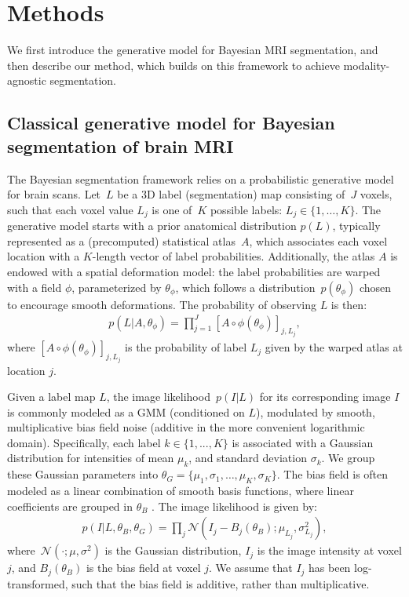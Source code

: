 \documentclass{midl}
\begin{document}
\section{Methods}

We first introduce the generative model for Bayesian MRI segmentation, and then describe our method, which builds on this framework to achieve modality-agnostic segmentation.

\subsection{Classical generative model for Bayesian segmentation of brain MRI}
\label{bayesian}

The Bayesian segmentation framework relies on a probabilistic generative model for brain  scans. Let~$L$ be a 3D label (segmentation) map consisting of~$J$ voxels, such that each voxel value $L_j$ is one of~$K$ possible labels: $L_j \in \{1,\ldots,K\}$. The generative model starts with a prior anatomical distribution $p(L)$, typically represented as a (precomputed) statistical atlas~$A$, which associates each voxel location with a $K$-length vector of label probabilities. Additionally, the atlas $A$ is endowed with a spatial deformation model: the label probabilities are warped with a field $\phi$, parameterized by $\theta_{\phi}$, which follows a distribution~$p(\theta_{\phi})$ chosen to encourage smooth deformations. The probability of observing $L$ is then:
\begin{align}
    p(L| A, \theta_\phi) = \prod_{j=1}^{J} [A \circ \phi(\theta_{\phi})]_{j,L_j},
\end{align}
where $[A \circ \phi(\theta_{\phi})]_{j,L_j}$ is the probability of label $L_j$ given by the warped atlas at location $j$. 

Given a label map $L$, the image likelihood~$p(I|L)$ for its corresponding image $I$ is commonly modeled as a GMM (conditioned on $L$), modulated by smooth, multiplicative bias field noise (additive in the more convenient logarithmic domain). Specifically, each label $k \in \lbrace1,...,K\rbrace$ is associated with a Gaussian distribution for intensities of mean $\mu_{k}$, and standard deviation $\sigma_{k}$. We group these Gaussian parameters into $\theta_G = \{\mu_1,\sigma_1,\ldots,\mu_K,\sigma_K\}$. The bias field is often modeled as a linear combination of smooth basis functions, where linear coefficients are grouped in $\theta_{B}$ \cite{larsen_n3_2014}. The image likelihood is given by:
\begin{align}
    p(I | L, \theta_B, \theta_G) = \prod_j \mathcal{N}(I_j - B_j(\theta_B) ; \mu_{L_j} , \sigma_{L_j}^2),
    \label{eq:likelihood}
\end{align}
where~$\mathcal{N}(\cdot; \mu, \sigma^2)$ is the Gaussian distribution, $I_j$ is the image intensity at voxel $j$, and $B_j(\theta_B)$ is the bias field at voxel $j$. We assume that $I_j$ has been log-transformed, such that the bias field is additive, rather than multiplicative.
\end{document}
